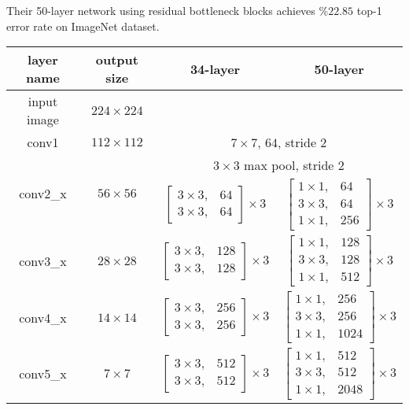 Their 50-layer network using residual bottleneck blocks achieves $\%22.85$ top-1 error rate on ImageNet dataset.


\iffalse
\begin{table}[]
\centering
\begin{tabular}{ | c | c | c | c | }
\hline
layer name			& output size 					& 34-layer																& 50-layer																			\\ \hline
input image			& $224 \times 224$				& \multicolumn{2}{c|}{}																																	\\ \hline
conv1				& $112 \times112$				& \multicolumn{2}{c|}{$ 7 \times 7$, $64$, stride $2$}																												\\ \hline
\multirow{2}{*}{conv2\_x}	& \multirow{2}{*}{$56 \times 56$} 	& \multicolumn{2}{c|}{$3 \times 3$ max pool, stride $2$}																											\\ \cline{3-4} 
					&							& $\begin{bmatrix} 3 \times 3, &   64 \\ 3 \times 3, &   64 \end{bmatrix} \times 3 $		& $\begin{bmatrix}1 \times 1, & 64 \\ 3 \times 3, & 64 \\ 1 \times 1, & 256 \end{bmatrix}^{} \times 3 $ 		\\ \hline
conv3\_x				& $28 \times 28$				& $\begin{bmatrix} 3 \times 3, & 128 \\ 3 \times 3, & 128 \end{bmatrix} \times 3 $		& $\begin{bmatrix}1 \times 1, & 128 \\ 3 \times 3, & 128 \\ 1 \times 1, & 512 \end{bmatrix} \times 3$		\\ \hline
conv4\_x				& $14 \times 14$				& $\begin{bmatrix} 3 \times 3, & 256 \\ 3 \times 3, & 256 \end{bmatrix} \times 3 $		& $\begin{bmatrix}1 \times 1, & 256 \\ 3 \times 3, & 256 \\ 1 \times 1, & 1024 \end{bmatrix} \times 3$		\\ \hline
conv5\_x				& $  7 \times   7$				& $\begin{bmatrix} 3 \times 3, & 512 \\ 3 \times 3, & 512 \end{bmatrix} \times 3 $		& $\begin{bmatrix}1 \times 1, & 512 \\ 3 \times 3, & 512 \\ 1 \times 1, & 2048 \end{bmatrix} \times 3$		\\ \hline

\end{tabular}
\end{table}
